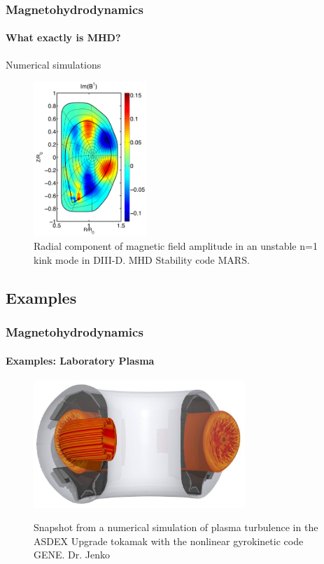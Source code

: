 \documentclass{beamer}
\begin{document}
\begin{frame}
 \frametitle{Magnetohydrodynamics}
 \framesubtitle{What exactly is MHD?}
 
 Numerical simulations
 \begin{figure}
  \includegraphics[width=4.25cm]{img/plasma_sim}
  \centering
  \caption{Radial component of magnetic field amplitude in an unstable n=1 kink mode in DIII-D. MHD Stability code MARS.}
 \end{figure}

\end{frame}


\subsection{Examples}

\begin{frame}
 \frametitle{Magnetohydrodynamics}
 \framesubtitle{Examples: Laboratory Plasma}
 \begin{figure}[t]
  \includegraphics[width=8cm]{img/tokamak_turbulence}
  \label{Fig:1}
  \caption{Snapshot from a numerical simulation of plasma turbulence in the ASDEX Upgrade tokamak with the nonlinear gyrokinetic code GENE. Dr. Jenko}
  \centering
 \end{figure}

\end{frame}
\end{document}

